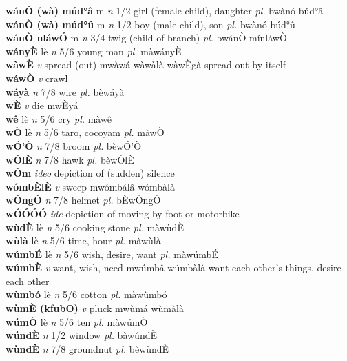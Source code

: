 \documentclass{article}
\begin{document}
{\bf wánÒ (wà) múd°â} m {\it n} 1/2 girl (female child), daughter {\it pl.} bwànó búd°â         \\ 
{\bf wánÒ (wà) múd°û} m {\it n} 1/2 boy (male child), son {\it pl.} bwànó búd°û         \\ 
{\bf wánÒ nláwÓ} m {\it n} 3/4 twig (child of branch) {\it pl.} bwánÒ mínláwÒ         \\ 
{\bf wányÈ} lè {\it n} 5/6 young man {\it pl.} màwányÈ         \\ 
{\bf wàwÈ}  {\it v} spread (out)   mwàwá   wàwàlà wàwÈgà spread out by itself  \\ 
{\bf wáwÒ}  {\it v} crawl         \\ 
{\bf wáyà}  {\it n} 7/8 wire {\it pl.} bèwáyà         \\ 
{\bf wÈ}  {\it v} die   mwÈyá      \\ 
{\bf wê} lè {\it n} 5/6 cry {\it pl.} màwê         \\ 
{\bf wÒ} lè {\it n} 5/6 taro, cocoyam {\it pl.} màwÒ         \\ 
{\bf wÓ'Ò}  {\it n} 7/8 broom {\it pl.} bèwÓ'Ò         \\ 
{\bf wÓlÈ}  {\it n} 7/8 hawk {\it pl.} bèwÓlÈ         \\ 
{\bf wÒm}  {\it ideo} depiction of (sudden) silence         \\ 
{\bf wómbÈlÈ}  {\it v} sweep   mwómbálâ   wómbàlà   \\ 
{\bf wÓngÓ}  {\it n} 7/8 helmet {\it pl.} bÈwÓngÓ         \\ 
{\bf wÓÓÓÓ}  {\it ide} depiction of moving by foot or motorbike         \\ 
{\bf wùdÈ} lè {\it n} 5/6 cooking stone {\it pl.} màwùdÈ         \\ 
{\bf wùlà} lè {\it n} 5/6 time, hour {\it pl.} màwùlà         \\ 
{\bf wúmbÉ} lè {\it n} 5/6 wish, desire, want {\it pl.} màwúmbÉ         \\ 
{\bf wúmbÈ}  {\it v} want, wish, need   mwúmbâ   wúmbàlà want each other's things, desire each other   \\ 
{\bf wùmbó} lè {\it n} 5/6 cotton {\it pl.} màwùmbó         \\ 
{\bf wùmÈ (kfubO)}  {\it v} pluck   mwùmá   wùmàlà   \\ 
{\bf wúmÒ} lè {\it n} 5/6 ten {\it pl.} màwúmÒ         \\ 
{\bf wúndÈ}  {\it n} 1/2 window {\it pl.} bàwúndÈ         \\ 
{\bf wùndÈ}  {\it n} 7/8 groundnut {\it pl.} bèwùndÈ         \\ 
\end{document}
